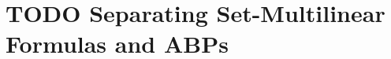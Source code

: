 \chapter{TODO Separating Set-Multilinear Formulas and ABPs}\label{chap:multilinear-abp-form-sep}

\cite{TLS22}
